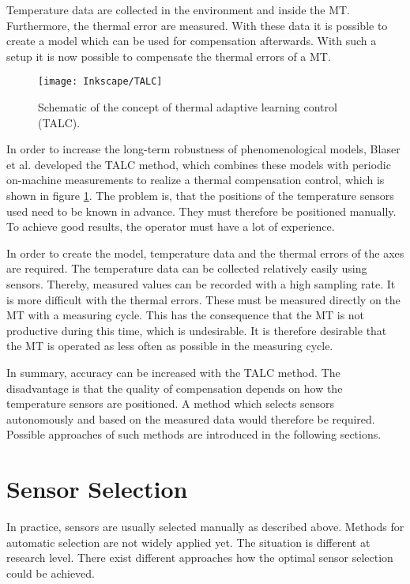 Temperature data are collected in the environment and inside the MT. Furthermore, the thermal error are measured. With these data it is possible to create a model which can be used for compensation afterwards. With such a setup it is now possible to compensate the thermal errors of a MT.

\begin{figure}[!htb]
    \centering
    \texttt{[image: Inkscape/TALC]} %
    \caption[Adaptive Input Selection]{Schematic of the concept of thermal adaptive learning control (TALC).}
    \label{fig:talc_inputselection}
\end{figure}


In order to increase the long-term robustness of phenomenological models, Blaser et al. \cite{Blaser_2017} developed the TALC method, which combines these models with periodic on-machine measurements to realize a thermal compensation control, which is shown in figure \ref{fig:talc_inputselection}. The problem is, that the positions of the temperature sensors used need to be known in advance. They must therefore be positioned manually. To achieve good results, the operator must have a lot of experience.

In order to create the model, temperature data and the thermal errors of the axes are required. The temperature data can be collected relatively easily using sensors. Thereby, measured values can be recorded with a high sampling rate. It is more difficult with the thermal errors. These must be measured directly on the MT with a measuring cycle. This has the consequence that the MT is not productive during this time, which is undesirable. It is therefore desirable that the MT is operated as less often as possible in the measuring cycle. 

In summary, accuracy can be increased with the TALC method. The disadvantage is that the quality of compensation depends on how the temperature sensors are positioned. A method which selects sensors autonomously and based on the measured data would therefore be required. Possible approaches of such methods are introduced in the following sections.

\section{Sensor Selection}
\label{sec:sensor_selectiom}

In practice, sensors are usually selected manually as described above. Methods for automatic selection are not widely applied yet. The situation is different at research level. There exist different approaches how the optimal sensor selection could be achieved. 


